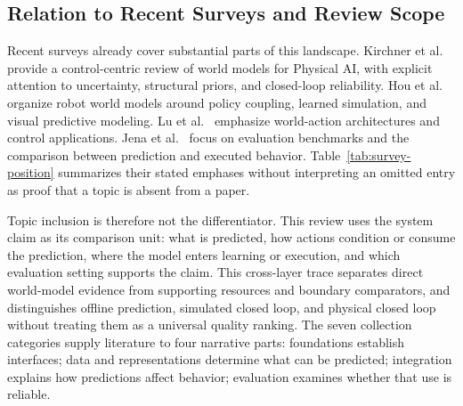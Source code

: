 \subsection{Relation to Recent Surveys and Review Scope}
Recent surveys already cover substantial parts of this landscape. Kirchner et al.~\cite{kirchner2026physicalai} provide a control-centric review of world models for Physical AI, with explicit attention to uncertainty, structural priors, and closed-loop reliability. Hou et al.~\cite{hou2026survey} organize robot world models around policy coupling, learned simulation, and visual predictive modeling. Lu et al.~\cite{lu2026survey} emphasize world-action architectures and control applications. Jena et al.~\cite{jena2026evaluation} focus on evaluation benchmarks and the comparison between prediction and executed behavior. Table~\ref{tab:survey-position} summarizes their stated emphases without interpreting an omitted entry as proof that a topic is absent from a paper.

Topic inclusion is therefore not the differentiator. This review uses the system claim as its comparison unit: what is predicted, how actions condition or consume the prediction, where the model enters learning or execution, and which evaluation setting supports the claim. This cross-layer trace separates direct world-model evidence from supporting resources and boundary comparators, and distinguishes offline prediction, simulated closed loop, and physical closed loop without treating them as a universal quality ranking. The seven collection categories supply literature to four narrative parts: foundations establish interfaces; data and representations determine what can be predicted; integration explains how predictions affect behavior; evaluation examines whether that use is reliable.

